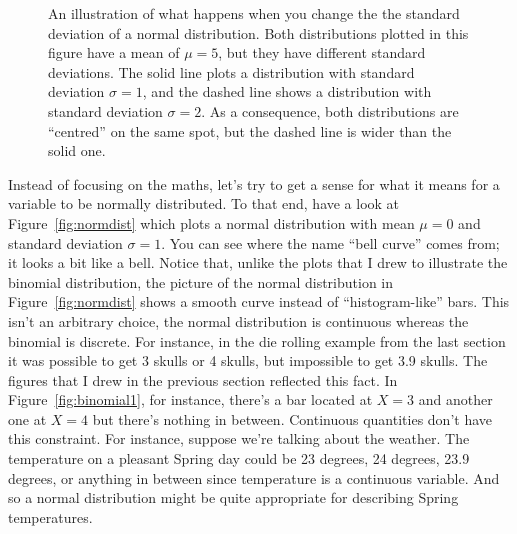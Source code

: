 \begin{figure}[t]
\begin{center}
\caption{An illustration of what happens when you change the the standard deviation of a normal distribution. Both distributions plotted in this figure have a mean of $\mu = 5$, but they have different standard deviations. The solid line plots a distribution with standard deviation $\sigma=1$, and the dashed line shows a distribution with standard deviation $\sigma = 2$. As a consequence, both distributions are ``centred'' on the same spot, but the dashed line is wider than the solid one.}
\label{fig:normsd}
\end{center}
\end{figure}

Instead of focusing on the maths, let's try to get a sense for what it means for a variable to be normally distributed. To that end, have a look at Figure~\ref{fig:normdist} which plots a normal distribution with mean $\mu = 0$ and standard deviation $\sigma = 1$. You can see where the name ``bell curve'' comes from; it looks a bit like a bell. Notice that, unlike the plots that I drew to illustrate the binomial distribution, the picture of the normal distribution in Figure~\ref{fig:normdist} shows a smooth curve instead of ``histogram-like'' bars. This isn't an arbitrary choice, the normal distribution is continuous whereas the binomial is discrete. For instance, in the die rolling example from the last section it was possible to get 3 skulls or 4 skulls, but impossible to get 3.9 skulls. The figures that I drew in the previous section reflected this fact. In Figure~\ref{fig:binomial1}, for instance, there's a bar located at $X=3$ and another one at $X=4$ but there's nothing in between. Continuous quantities don't have this constraint. For instance, suppose we're talking about the weather. The temperature on a pleasant Spring day could be 23 degrees, 24 degrees, 23.9 degrees, or anything in between since temperature is a continuous variable. And so a normal distribution might be quite appropriate for describing Spring temperatures. 

